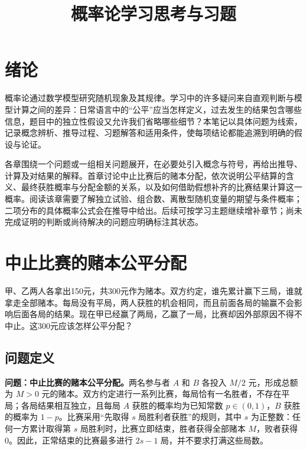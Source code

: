 \documentclass[UTF8]{ctexbook}
\title{概率论学习思考与习题}
\author{}
\date{}
\begin{document}
\maketitle

\frontmatter
\tableofcontents

\chapter{绪论}

概率论通过数学模型研究随机现象及其规律。学习中的许多疑问来自直观判断与模型计算之间的差异：日常语言中的“公平”应当怎样定义，过去发生的结果包含哪些信息，题目中的独立性假设又允许我们省略哪些细节？本笔记以具体问题为线索，记录概念辨析、推导过程、习题解答和适用条件，使每项结论都能追溯到明确的假设与论证。

各章围绕一个问题或一组相关问题展开，在必要处引入概念与符号，再给出推导、计算及对结果的解释。首章讨论中止比赛后的赌本分配，依次说明公平结算的含义、最终获胜概率与分配金额的关系，以及如何借助假想补齐的比赛结果计算这一概率。阅读该章需要了解独立试验、组合数、离散型随机变量的期望与条件概率；二项分布的具体概率公式会在推导中给出。后续可按学习主题继续增补章节；尚未完成证明的判断或尚待解决的问题应明确标注其状态。

\mainmatter

\chapter{中止比赛的赌本公平分配}
\label{chap:points-fair-allocation}

甲、乙两人各拿出150元，共300元作为赌本。双方约定，谁先累计赢下三局，谁就拿走全部赌本。每局没有平局，两人获胜的机会相同，而且前面各局的输赢不会影响后面各局的结果。现在甲已经赢了两局，乙赢了一局，比赛却因外部原因不得不中止。这300元应该怎样公平分配？

\section{问题定义}
\label{sec:points-problem}

\textbf{问题：中止比赛的赌本公平分配。}两名参与者 \(A\) 和 \(B\) 各投入 \(M/2\) 元，形成总额为 \(M>0\) 元的赌本。双方约定进行一系列比赛，每局恰有一名胜者，不存在平局；各局结果相互独立，且每局 \(A\) 获胜的概率均为已知常数 \(p\in(0,1)\)，\(B\) 获胜的概率为 \(1-p\)。比赛采用“先取得 \(s\) 局胜利者获胜”的规则，其中 \(s\) 为正整数：任何一方累计取得第 \(s\) 局胜利时，比赛立即结束，胜者获得全部赌本 \(M\)，败者获得 \(0\)。因此，正常结束的比赛最多进行 \(2s-1\) 局，并不要求打满这些局数。
\end{document}
